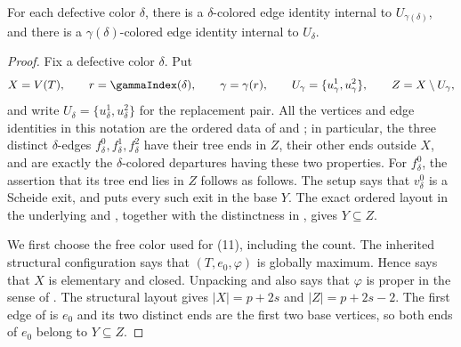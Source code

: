 \begin{lemma}
For each defective color $\delta$, there is a $\delta$-colored edge
identity internal to $U_{\gamma(\delta)}$, and there is a
$\gamma(\delta)$-colored edge identity internal to $U_\delta$.
\end{lemma}
\begin{proof}
Fix a defective color $\delta$.  Put
\[
 X=V(T),\qquad r=\gammaIndex(\delta),\qquad
 \gamma=\gamma(r),\qquad
 U_\gamma=\{u^1_\gamma,u^2_\gamma\},\qquad Z=X\setminus U_\gamma,
\]
and write $U_\delta=\{u^1_\delta,u^2_\delta\}$ for the replacement
pair.  All the vertices and edge identities in this notation are the
ordered data of  and
; in particular, the three distinct
$\delta$-edges $f^0_\delta,f^1_\delta,f^2_\delta$ have their tree ends in
$Z$, their other ends outside $X$, and are exactly the $\delta$-colored
departures having these two properties.  For $f^0_\delta$, the assertion
that its tree end lies in $Z$ follows as follows.  The setup says that
$v^0_\delta$ is a Scheide exit, and
 puts every such exit in the base
$Y$.  The exact ordered layout in the underlying
 and
, together with the distinctness
in , gives $Y\subseteq Z$.

We first choose the free color used for (11), including the count.  The
inherited structural configuration says that $(T,e_0,\varphi)$ is
globally maximum.  Hence  says that
$X$ is elementary and closed.  Unpacking
 and  also says that
$\varphi$ is proper in the sense of
.  The structural layout gives
$|X|=p+2s$ and $|Z|=p+2s-2$.  The first edge of
 is $e_0$ and its two distinct ends are the first
two base vertices, so both ends of $e_0$ belong to $Y\subseteq Z$.


\end{proof}

